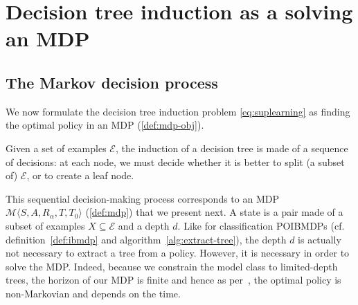 \chapter{Decision tree induction as a solving an MDP}\label{sec:dt-mdp}

\section{The Markov decision process}\label{sec:the-mdp}
We now formulate the decision tree induction problem \ref{eq:suplearning} as finding the optimal policy in an MDP (\ref{def:mdp-obj}).

Given a set of examples $\mathcal{E}$, the induction of a decision tree is made of a sequence of decisions: at each node, we must decide whether it is better to split (a subset of) $\mathcal{E}$, or %
to create a leaf node.

This sequential decision-making process corresponds to an MDP $\mathcal{M} \langle S, A, R_{\alpha}, T, T_0 \rangle$ (\ref{def:mdp}) that we present next.
A state is a pair made of a subset of examples $X\subseteq\mathcal E$ and a depth $d$.
Like for classification POIBMDPs (cf. definition~\ref{def:ibmdp} and algorithm~\ref{alg:extract-tree}), the depth $d$ is actually not necessary to extract a tree from a policy.
However, it is necessary in order to solve the MDP.
Indeed, because we constrain the model class to limited-depth trees, the horizon of our MDP is finite and hence as per~\cite{puterman}, the optimal policy is non-Markovian and depends on the time.

